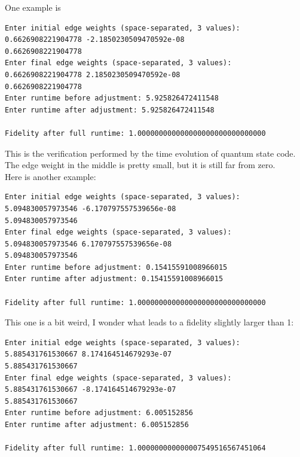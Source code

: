 \documentclass[aps]{revtex4-2}
\begin{document}
\begin{center}
\end{center}
One example is
\begin{verbatim}
Enter initial edge weights (space-separated, 3 values): 0.6626908221904778 -2.1850230509470592e-08 
0.6626908221904778
Enter final edge weights (space-separated, 3 values): 0.6626908221904778 2.1850230509470592e-08 
0.6626908221904778
Enter runtime before adjustment: 5.925826472411548
Enter runtime after adjustment: 5.925826472411548
    
Fidelity after full runtime: 1.000000000000000000000000000000
\end{verbatim}
This is the verification performed by the time evolution of quantum state code. The edge weight in the middle is pretty small, but it is still far from zero.\\
Here is another example:
\begin{verbatim}
Enter initial edge weights (space-separated, 3 values): 5.094830057973546 -6.170797557539656e-08 
5.094830057973546
Enter final edge weights (space-separated, 3 values): 5.094830057973546 6.170797557539656e-08 
5.094830057973546
Enter runtime before adjustment: 0.15415591008966015
Enter runtime after adjustment: 0.15415591008966015

Fidelity after full runtime: 1.000000000000000000000000000000
\end{verbatim}
This one is a bit weird, I wonder what leads to a fidelity slightly larger than 1:
\begin{verbatim}
Enter initial edge weights (space-separated, 3 values): 5.885431761530667 8.174164514679293e-07 
5.885431761530667
Enter final edge weights (space-separated, 3 values): 5.885431761530667 -8.174164514679293e-07 
5.885431761530667
Enter runtime before adjustment: 6.005152856
Enter runtime after adjustment: 6.005152856

Fidelity after full runtime: 1.000000000000007549516567451064
\end{verbatim}
\end{document}
